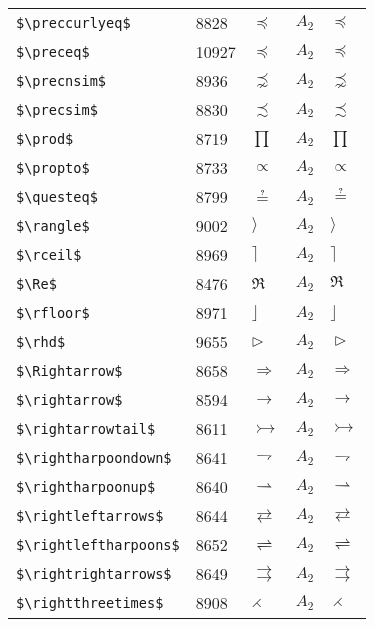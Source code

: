 \documentclass{article}
\begin{document}
\begin{table}
\begin{center}
\begin{tabular}{llll}
 \verb#$\preccurlyeq$#        & 8828 & $\preccurlyeq$        & $A_2\quad \preccurlyeq$\\
 \verb#$\preceq$#            & 10927 & $\preceq$             & $A_2\quad \preceq$\\
 \verb#$\precnsim$#           & 8936 & $\precnsim$           & $A_2\quad \precnsim$\\
 \verb#$\precsim$#            & 8830 & $\precsim$            & $A_2\quad \precsim$\\
 \verb#$\prod$#               & 8719 & $\prod$               & $A_2\quad \prod$\\
 \verb#$\propto$#             & 8733 & $\propto$             & $A_2\quad \propto$\\
 \verb#$\questeq$#            & 8799 & $\questeq$            & $A_2\quad \questeq$\\
 \verb#$\rangle$#             & 9002 & $\rangle$             & $A_2\quad \rangle$\\
 \verb#$\rceil$#              & 8969 & $\rceil$              & $A_2\quad \rceil$\\
 \verb#$\Re$#                 & 8476 & $\Re$                 & $A_2\quad \Re$\\
 \verb#$\rfloor$#             & 8971 & $\rfloor$             & $A_2\quad \rfloor$\\
 \verb#$\rhd$#                & 9655 & $\rhd$                & $A_2\quad \rhd$\\
 \verb#$\Rightarrow$#         & 8658 & $\Rightarrow$         & $A_2\quad \Rightarrow$\\
 \verb#$\rightarrow$#         & 8594 & $\rightarrow$         & $A_2\quad \rightarrow$\\
 \verb#$\rightarrowtail$#     & 8611 & $\rightarrowtail$     & $A_2\quad \rightarrowtail$\\
 \verb#$\rightharpoondown$#   & 8641 & $\rightharpoondown$   & $A_2\quad \rightharpoondown$\\
 \verb#$\rightharpoonup$#     & 8640 & $\rightharpoonup$     & $A_2\quad \rightharpoonup$\\
 \verb#$\rightleftarrows$#    & 8644 & $\rightleftarrows$    & $A_2\quad \rightleftarrows$\\
 \verb#$\rightleftharpoons$#  & 8652 & $\rightleftharpoons$  & $A_2\quad \rightleftharpoons$\\
 \verb#$\rightrightarrows$#   & 8649 & $\rightrightarrows$   & $A_2\quad \rightrightarrows$\\
 \verb#$\rightthreetimes$#    & 8908 & $\rightthreetimes$    & $A_2\quad \rightthreetimes$\\

\end{tabular}
\end{center}
\end{table}
\end{document}
